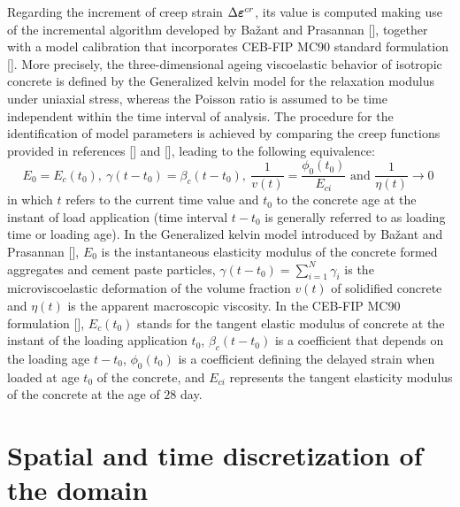 \documentclass[a4paper,fleqn]{cas-sc}
\begin{document}
Regarding the increment of creep strain $\Delta \boldsymbol{\varepsilon}^{cr}$, its value is computed making use of the incremental algorithm developed by Bažant and Prasannan [], together with a model calibration that incorporates CEB-FIP MC90 standard formulation []. More precisely, the three-dimensional ageing viscoelastic behavior of isotropic concrete is defined by the Generalized kelvin model for the relaxation modulus under uniaxial stress, whereas the Poisson ratio is assumed to be time independent within the time interval of analysis. The procedure for the identification of model parameters is achieved by comparing the creep functions provided in references [] and [], leading to the following equivalence:
\begin{equation} \label{eq:11}
	E_0 = E_c(t_0),~ \gamma(t-t_0)=\beta_c(t-t_0),~ \frac{1}{v(t)} = \frac{\phi_0(t_0)}{E_{ci}} \text{  and  } \frac{1}{\eta(t)} \to 0 \;
\end{equation}
in which $t$ refers to the current time value and $t_0$ to the concrete age at the instant of load application (time interval $t-t_0$ is generally referred to as loading time or loading age). In the Generalized kelvin model introduced by Bažant and Prasannan [], $E_0$ is the instantaneous elasticity modulus of the concrete formed aggregates and cement paste particles, $\gamma(t-t_0) = \sum\limits_{i=1}^{N}\gamma_i$ is the microviscoelastic deformation of the volume fraction $v(t)$ of solidified concrete and $\eta(t)$ is the apparent macroscopic viscosity. In the CEB-FIP MC90 formulation [], $E_c(t_0)$ stands for the tangent elastic modulus of concrete at the instant of the loading application $t_0$, $\beta_c(t-t_0)$ is a coefficient that depends on the loading age $t-t_0$, $\phi_0(t_0)$ is a coefficient defining the delayed strain when loaded at age $t_0$ of the concrete, and $E_{ci}$ represents the tangent elasticity modulus of the concrete at the age of $28$ day.

\section{Spatial and time discretization of the domain}\label{}
\end{document}
